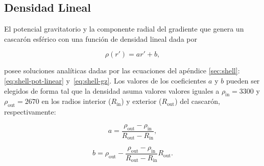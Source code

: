 \subsection{Densidad Lineal}

El potencial gravitatorio y la componente radial del gradiente que genera un
cascarón esférico con una función de densidad lineal dada por

\begin{equation}
    \rho(r') = ar' + b,
    \label{eq:density-linear}
\end{equation}

\noindent posee soluciones analíticas dadas por las ecuaciones del apéndice
\ref{sec:shell}: \ref{eq:shell-pot-linear} y~\ref{eq:shell-gz}.
Los valores de los coeficientes $a$ y $b$ pueden ser elegidos de forma tal que
la densidad asuma valores valores iguales a  $\rho_\text{in}
= 3300$\kgpercubicm{} y $\rho_\text{out} = 2670$\kgpercubicm{} en los radios
interior ($R_\text{in}$) y exterior ($R_\text{out}$) del cascarón,
respectivamente:

\begin{equation}
    a = \frac{\rho_\text{out} - \rho_\text{in}}{R_\text{out} - R_\text{in}},
\end{equation}

\begin{equation}
    b = \rho_\text{out} -
    \frac{
        \rho_\text{out} - \rho_\text{in}
    }{
        R_\text{out} - R_\text{in}
    } R_\text{out}.
\end{equation}


